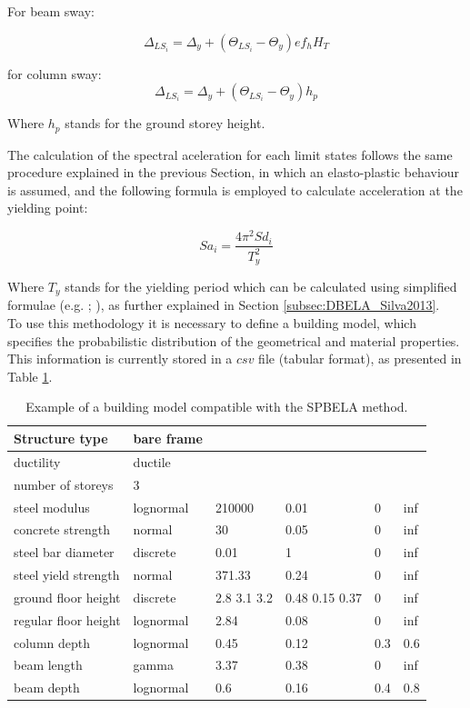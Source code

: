 For beam sway:

\begin{equation}
\Delta_{LS_i} = \Delta_y + (\Theta_{LS_i} - \Theta_y)ef_hH_T
\end{equation}

for column sway:
\begin{equation}
\Delta_{LS_i} = \Delta_y + (\Theta_{LS_i} - \Theta_y)h_p
\end{equation}

Where $h_p$ stands for the ground storey height.

The calculation of the spectral aceleration for each limit states follows the same procedure explained in the previous Section, in which an elasto-plastic behaviour is assumed, and the following formula is employed to calculate acceleration at the yielding point:

\begin{equation}
Sa_i = \frac{4\pi^2Sd_i}{T_y^2}
\end{equation}

Where $T_y$ stands for the yielding period which can be calculated using simplified formulae (e.g. \cite{CrowleyPinho2004}; \cite{CrowleyPinho2006}), as further explained in Section \ref{subsec:DBELA_Silva2013}. \\ 

To use this methodology it is necessary to define a building model, which specifies the probabilistic distribution of the geometrical and material properties. This information is currently stored in a $csv$ file (tabular format), as presented in Table \ref{table:building_model}.
 
\begin {table}[htb]
\caption{Example of a building model compatible with the SPBELA method.} 
\label{table:building_model} 
\begin{center}
  \begin{tabular}{ | l | l | l | l | l | l |}
  \hline
Structure type & bare frame &  &  &  &  \\ \hline
ductility & ductile &  &  &  &  \\ \hline
number of storeys & 3 &  &  &  &  \\ \hline
steel modulus & lognormal & 210000 & 0.01 & 0 & inf \\ \hline
concrete strength & normal & 30 & 0.05 & 0 & inf \\ \hline
steel bar diameter & discrete & 0.01 & 1 & 0 & inf \\ \hline
steel yield strength & normal & 371.33 & 0.24 & 0 & inf \\ \hline
ground floor height & discrete & 2.8 3.1 3.2 & 0.48 0.15 0.37 & 0 & inf \\ \hline
regular floor height & lognormal & 2.84 & 0.08 & 0 & inf \\ \hline
column depth & lognormal & 0.45 & 0.12 & 0.3 & 0.6 \\ \hline
beam length & gamma & 3.37 & 0.38 & 0 & inf \\ \hline
beam depth & lognormal & 0.6 & 0.16 & 0.4 & 0.8 \\ \hline
  \end{tabular}
\end{center}
\end{table}

